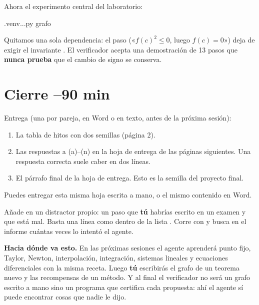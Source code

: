 Ahora el experimento central del laboratorio:
\begin{orden}
.venv\Scripts\python ..\docs\curso{}\experimentos.py grafo
\end{orden}
Quitamos una sola dependencia: el paso  («$f(c)^2\le 0$, luego $f(c)=0$») deja de exigir el invariante . El verificador acepta una demostración de 13 pasos que \textbf{nunca prueba} que el cambio de signo se conserva.

\begin{preguntas}
\end{preguntas}

\section{Cierre \hfill\small{}–90 min}

Entrega (una por pareja, en Word o en texto, antes de la próxima sesión):
\begin{enumerate}
\item La tabla de hitos con dos semillas (página 2).
\item Las respuestas a (a)–(n) en la hoja de entrega de las páginas siguientes. Una respuesta correcta suele caber en dos líneas.
\item El párrafo final de la hoja de entrega. Esto es la semilla del proyecto final.
\end{enumerate}
Puedes entregar esta misma hoja escrita a mano, o el mismo contenido en Word.

\begin{nota}
Añade en  un distractor propio: un paso que \textbf{tú} habrías escrito en un examen y que está mal. Basta una línea como  dentro de la lista . Corre con  y busca en el informe cuántas veces lo intentó el agente.
\end{nota}

\textbf{Hacia dónde va esto.} En las próximas sesiones el agente aprenderá punto fijo, Taylor, Newton, interpolación, integración, sistemas lineales y ecuaciones diferenciales con la misma receta. Luego \textbf{tú} escribirás el grafo de un teorema nuevo y las recompensas de un método. Y al final el verificador no será un grafo escrito a mano sino un programa que certifica cada propuesta: ahí el agente sí puede encontrar cosas que nadie le dijo.

